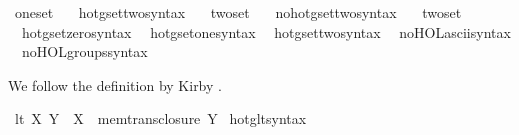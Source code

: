 \begin{isabellebody}
\ one{\isacharunderscore}{\kern0pt}set\ {\isacharparenleft}{\kern0pt}{\isachardoublequoteopen}{}{\isachardoublequoteclose}{\isacharparenright}{\kern0pt}\ \isamarkupfalse%
\isanewline
\isanewline
{}\isamarkupfalse%
\ hotg{\isacharunderscore}{\kern0pt}set{\isacharunderscore}{\kern0pt}two{\isacharunderscore}{\kern0pt}syntax\ \ \isamarkupfalse%
\ two{\isacharunderscore}{\kern0pt}set\ {\isacharparenleft}{\kern0pt}{\isachardoublequoteopen}{}{\isachardoublequoteclose}{\isacharparenright}{\kern0pt}\ \isamarkupfalse%
\isanewline
{}\isamarkupfalse%
\ no{\isacharunderscore}{\kern0pt}hotg{\isacharunderscore}{\kern0pt}set{\isacharunderscore}{\kern0pt}two{\isacharunderscore}{\kern0pt}syntax\ \ \isamarkupfalse%
\ two{\isacharunderscore}{\kern0pt}set\ {\isacharparenleft}{\kern0pt}{\isachardoublequoteopen}{}{\isachardoublequoteclose}{\isacharparenright}{\kern0pt}\ \isamarkupfalse%
\isanewline
\isanewline
{}\isamarkupfalse%
\isanewline
\ \ hotg{\isacharunderscore}{\kern0pt}set{\isacharunderscore}{\kern0pt}zero{\isacharunderscore}{\kern0pt}syntax\isanewline
\ \ hotg{\isacharunderscore}{\kern0pt}set{\isacharunderscore}{\kern0pt}one{\isacharunderscore}{\kern0pt}syntax\isanewline
\ \ hotg{\isacharunderscore}{\kern0pt}set{\isacharunderscore}{\kern0pt}two{\isacharunderscore}{\kern0pt}syntax\isanewline
{}\isamarkupfalse%
\isanewline
\ \ no{\isacharunderscore}{\kern0pt}HOL{\isacharunderscore}{\kern0pt}ascii{\isacharunderscore}{\kern0pt}syntax\isanewline
\ \ no{\isacharunderscore}{\kern0pt}HOL{\isacharunderscore}{\kern0pt}groups{\isacharunderscore}{\kern0pt}syntax%
\isadelimdocument
%
\endisadelimdocument
%
\isatagdocument
%
\isamarkuptrue%
%
\endisatagdocument
{\isafolddocument}%
%
\isadelimdocument
%
\endisadelimdocument
%
\begin{isamarkuptext}%
We follow the definition by Kirby \cite{kirby_set_arithemtics}.%
\end{isamarkuptext}\isamarkuptrue%
\isamarkupfalse%
\ {\isachardoublequoteopen}lt\ X\ Y\ {\isasymequiv}\ X\ {\isasymin}\ mem{\isacharunderscore}{\kern0pt}trans{\isacharunderscore}{\kern0pt}closure\ Y{\isachardoublequoteclose}\isanewline
\isanewline
{}\isamarkupfalse%
\ hotg{\isacharunderscore}{\kern0pt}lt{\isacharunderscore}{\kern0pt}syntax\ \ \isamarkupfalse%

\end{isabellebody}
